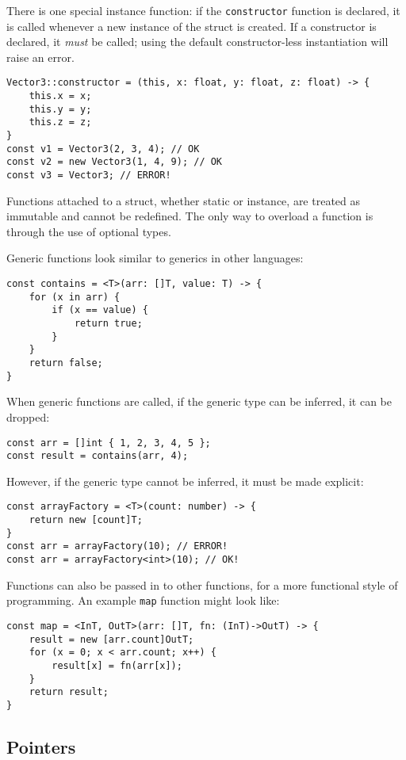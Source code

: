 \documentclass[12pt]{article}
\begin{document}
There is one special instance function: if the \lstinline!constructor! function is declared, it is called whenever a new instance of the struct is created. If a constructor is declared, it \emph{must} be called; using the default constructor-less instantiation will raise an error.

\begin{lstlisting}
Vector3::constructor = (this, x: float, y: float, z: float) -> {
	this.x = x;
	this.y = y;
	this.z = z;
}
const v1 = Vector3(2, 3, 4); // OK
const v2 = new Vector3(1, 4, 9); // OK
const v3 = Vector3; // ERROR!
\end{lstlisting}

Functions attached to a struct, whether static or instance, are treated as immutable and cannot be redefined. The only way to overload a function is through the use of optional types.

Generic functions look similar to generics in other languages:

\begin{lstlisting}
const contains = <T>(arr: []T, value: T) -> {
	for (x in arr) {
		if (x == value) {
			return true;
		}
	}
	return false;
}
\end{lstlisting}

When generic functions are called, if the generic type can be inferred, it can be dropped:

\begin{lstlisting}
const arr = []int { 1, 2, 3, 4, 5 };
const result = contains(arr, 4);
\end{lstlisting}

However, if the generic type cannot be inferred, it must be made explicit:

\begin{lstlisting}
const arrayFactory = <T>(count: number) -> {
	return new [count]T;
}
const arr = arrayFactory(10); // ERROR!
const arr = arrayFactory<int>(10); // OK!
\end{lstlisting}

Functions can also be passed in to other functions, for a more functional style of programming. An example \lstinline!map! function might look like:

\begin{lstlisting}
const map = <InT, OutT>(arr: []T, fn: (InT)->OutT) -> {
	result = new [arr.count]OutT;
	for (x = 0; x < arr.count; x++) {
		result[x] = fn(arr[x]);
	}
	return result;
}
\end{lstlisting}

\subsection{Pointers}
\end{document}
